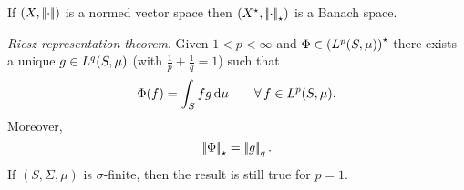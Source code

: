 \documentclass{article}
\begin{document}
\begin{corollary}
	If $\left(X,\left|\negthinspace\left|\cdot\right|\negthinspace\right|\right)$ is a normed vector space then $\left(X^{\star},\left|\negthinspace\left|\cdot\right|\negthinspace\right|_{\star}\right)$ is a Banach space.
\end{corollary}
\begin{theorem}
	\emph{Riesz representation theorem}. Given $1<p<\infty$ and $\Phi\in\left(L^{p}(S,\mu)\right)^{\star}$ there exists a unique $g\in L^{q}(S,\mu)$ (with $\frac{1}{p}+\frac{1}{q}=1$) such that
	\begin{equation*}
		\Phi(f)=\int_{S}fg\mathop{}\!\mathrm{d}\mu\qquad\forall\, f\in L^{p}(S,\mu)
.	\end{equation*}
Moreover,
\begin{equation*}
	\left|\negthinspace\left|\Phi\right|\negthinspace\right|_{\star}=\left|\negthinspace\left|g\right|\negthinspace\right|_{q}.
\end{equation*}
If $(S,\Sigma,\mu)$ is $\sigma$-finite, then the result is still true for $p=1$.
\end{theorem}
\end{document}
